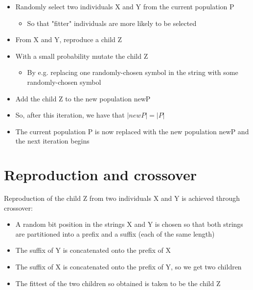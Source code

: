 \documentclass{article}[18pt]
\begin{document}
\begin{itemize}
	\item Randomly select two individuals X and Y from the current population P
	\begin{itemize}
		\item So that "fitter" individuals are more likely to be selected
	\end{itemize}
	\item From X and Y, reproduce a child Z
	\item With a small probability mutate the child Z
	\begin{itemize}
		\item By e.g. replacing one randomly-chosen symbol in the string with some randomly-chosen symbol
	\end{itemize}
	\item Add the child Z to the new population newP
	\item So, after this iteration, we have that $|newP|=|P|$
	\item The current population P is now replaced with the new population newP and the next iteration begins
\end{itemize}
\section{Reproduction and crossover}
Reproduction of the child Z from two individuals X and Y is achieved through crossover:
\begin{itemize}
	\item A random bit position in the strings X and Y is chosen so that both strings are partitioned into a prefix and a suffix (each of the same length)
	\item The suffix of Y is concatenated onto the prefix of X
	\item The suffix of X is concatenated onto the prefix of Y, so we get two children
	\item The fittest of the two children so obtained is taken to be the child Z
\end{itemize}
\end{document}
